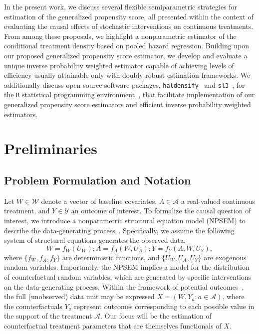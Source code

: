 In the present work, we discuss several flexible semiparametric strategies for
estimation of the generalized propensity score, all presented within the context
of evaluating the causal effects of stochastic interventions on continuous
treatments. From among these proposals, we highlight a nonparametric estimator
of the conditional treatment density based on pooled hazard regression. Building
upon our proposed generalized propensity score estimator, we develop and
evaluate a unique inverse probability weighted estimator capable of achieving
levels of efficiency usually attainable only with doubly robust estimation
frameworks. We additionally discuss open source software packages,
\texttt{haldensify}~\citep{hejazi2021haldensify} and
\texttt{sl3}~\citep{coyle2021sl3}, for the \texttt{R} statistical programming
environment~\citep{R}, that facilitate implementation of our generalized
propensity score estimators and efficient inverse probability weighted
estimators.

\section{Preliminaries}\label{one_prelim}

\subsection{Problem Formulation and Notation}\label{setup}

Let $W \in \mathcal{W}$ denote a vector of baseline covariates, $A \in
\mathcal{A}$ a real-valued continuous treatment, and $Y \in \mathcal{Y}$ an
outcome of interest. To formalize the causal question of interest, we introduce
a nonparametric structural equation model (NPSEM) to describe the
data-generating process~\citep{pearl2009causality}. Specifically, we assume the
following system of structural equations generates the observed data:
\begin{equation*}\label{npsem}
  W = f_W(U_W); A = f_A(W, U_A); Y = f_Y(A, W, U_Y),
\end{equation*}
where $\{f_W, f_A, f_Y\}$ are deterministic functions, and $\{U_W, U_A, U_Y\}$
are exogenous random variables. Importantly, the NPSEM implies a model for the
distribution of counterfactual random variables, which are generated by specific
interventions on the data-generating process. Within the framework of potential
outcomes~\citep{neyman1938contribution, rubin1978bayesian,
rubin1980randomization, rubin2005causal}, the full (unobserved) data unit may be
expressed $X = (W, Y_a: a \in \mathcal{A})$, where the counterfactuals $Y_a$
represent outcomes corresponding to each possible value in the support of the
treatment $\mathcal{A}$. Our focus will be the estimation of counterfactual
treatment parameters that are themselves functionals of $X$.

